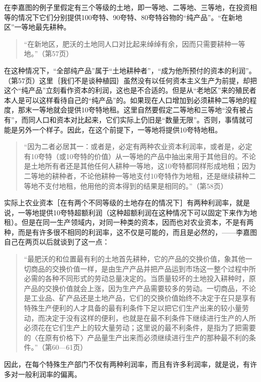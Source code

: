 在李嘉图的例子里假定有三个等级的土地，即一等地、二等地、三等地，在投资相等的情况下它们分别提供100夸特、90夸特、80夸特谷物的“纯产品”。“在新地区”一等地最先耕种。

\begin{quote}{“在新地区，肥沃的土地同人口对比起来绰绰有余，因而只需要耕种一等地。”（第57页）}\end{quote}

在这种情况下，“全部纯产品”属于“土地耕种者”，“成为他所预付的资本的利润”。（第57页）这里｛我们不是谈种植园｝虽然没有以任何资本主义生产为前提，却把这个“纯产品”立刻看作资本的利润，这也是不合适的。但是从“老地区”来的殖民者本人是可以这样看待自己的“纯产品”的。如果现在人口增加到必须耕种二等地的程度，那末一等地就会提供10夸特地租。这里自然要假定二等地和三等地“没有被占有”，而同人口和资本对比起来，它们实际上仍旧是“数量无限”。否则，事情就可能是另外一个样子。因此，在这个前提下，一等地将提供10夸特地租。

\begin{quote}{“因为二者必居其一：或者是，必定有两种农业资本利润率，或者是，必定有10夸特（或10夸特的价值）从一等地的产品中抽出来用于其他目的。不论是土地所有者还是其他任何人耕种一等地，这10夸特都同样形成地租；因为二等地的耕种者，不论他耕种一等地支付10夸特作为地租，还是继续耕种二等地不支付地租，他用他的资本得到的结果是相同的。”（第58页）}\end{quote}

实际上农业资本［在有两个不同等级的土地存在的情况下］有两种利润率，就是说，一等地提供10夸特超额利润（这种超额利润在这种情况下可以固定下来作为地租）。但是在同一生产领域内，对同一种类的资本，因而也对农业资本，不是有两种，而是有许多很不相同的利润率，这不仅是可能的，而且是必然的，——李嘉图自己在两页以后就谈到了这一点：

\begin{quote}{“最肥沃的和位置最有利的土地首先耕种，它的产品的交换价值，象其他一切商品的交换价值一样，是由生产产品并把产品运到市场这一整个过程中所必需的各种不同形式的劳动总量决定的。当质量较坏的土地投入耕种时，原产品的交换价值就会上涨，因为生产产品需要较多的劳动。一切商品，不论是工业品、矿产品还是土地产品，它们的交换价值始终不决定于在只是享有特殊生产便利的人才具备的最有利条件下足以把它们生产出来的较小量劳动，而决定于没有这样的便利，也就是在最不利条件下继续进行生产的人所必须花在它们生产上的较大量劳动；这里说的最不利条件，是指为了把需要的〈在原有价格下〉产品量生产出来而必须继续进行生产的那种最不利的条件。”（第60—61页）}\end{quote}

因此，在每个特殊生产部门不仅有两种利润率，而且有许多利润率，就是说，有许多对一般利润率的偏离。

